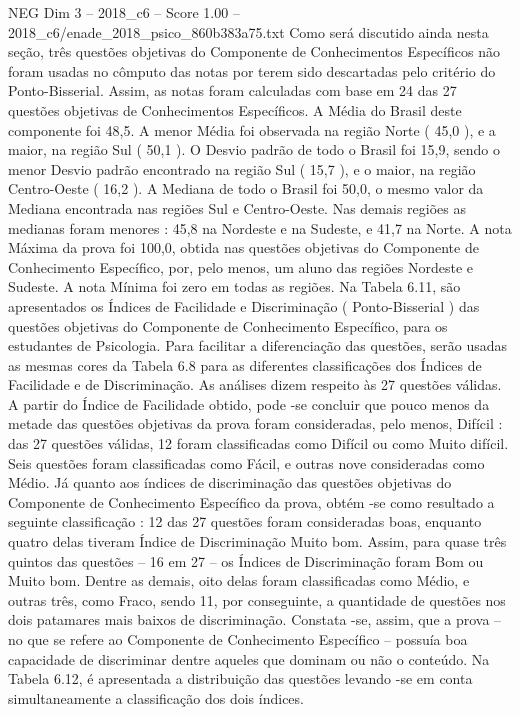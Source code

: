 \begin{textsample}{NEG Dim 3 – 2018\_c6 – Score 1.00 – 2018\_c6/enade\_2018\_psico\_860b383a75.txt}
Como será discutido ainda nesta seção, três questões objetivas do Componente de Conhecimentos Específicos não foram usadas no cômputo das notas por terem sido descartadas pelo critério do Ponto-Bisserial.
Assim, as notas foram calculadas com base em 24 das 27 questões objetivas de Conhecimentos Específicos.
A Média do Brasil deste componente foi 48,5.
A menor Média foi observada na região Norte ( 45,0 ), e a maior, na região Sul ( 50,1 ).
O Desvio padrão de todo o Brasil foi 15,9, sendo o menor Desvio padrão encontrado na região Sul ( 15,7 ), e o maior, na região Centro-Oeste ( 16,2 ).
A Mediana de todo o Brasil foi 50,0, o mesmo valor da Mediana encontrada nas regiões Sul e Centro-Oeste.
Nas demais regiões as medianas foram menores : 45,8 na Nordeste e na Sudeste, e 41,7 na Norte.
A nota Máxima da prova foi 100,0, obtida nas questões objetivas do Componente de Conhecimento Específico, por, pelo menos, um aluno das regiões Nordeste e Sudeste.
A nota Mínima foi zero em todas as regiões.
Na Tabela 6.11, são apresentados os Índices de Facilidade e Discriminação ( Ponto-Bisserial ) das questões objetivas do Componente de Conhecimento Específico, para os estudantes de Psicologia.
Para facilitar a diferenciação das questões, serão usadas as mesmas cores da Tabela 6.8 para as diferentes classificações dos Índices de Facilidade e de Discriminação.
As análises dizem respeito às 27 questões válidas.
A partir do Índice de Facilidade obtido, pode -se concluir que pouco menos da metade das questões objetivas da prova foram consideradas, pelo menos, Difícil : das 27 questões válidas, 12 foram classificadas como Difícil ou como Muito difícil.
Seis questões foram classificadas como Fácil, e outras nove consideradas como Médio.
Já quanto aos índices de discriminação das questões objetivas do Componente de Conhecimento Específico da prova, obtém -se como resultado a seguinte classificação : 12 das 27 questões foram consideradas boas, enquanto quatro delas tiveram Índice de Discriminação Muito bom.
Assim, para quase três quintos das questões – 16 em 27 – os Índices de Discriminação foram Bom ou Muito bom.
Dentre as demais, oito delas foram classificadas como Médio, e outras três, como Fraco, sendo 11, por conseguinte, a quantidade de questões nos dois patamares mais baixos de discriminação.
Constata -se, assim, que a prova – no que se refere ao Componente de Conhecimento Específico – possuía boa capacidade de discriminar dentre aqueles que dominam ou não o conteúdo.
Na Tabela 6.12, é apresentada a distribuição das questões levando -se em conta simultaneamente a classificação dos dois índices.

\end{textsample}
